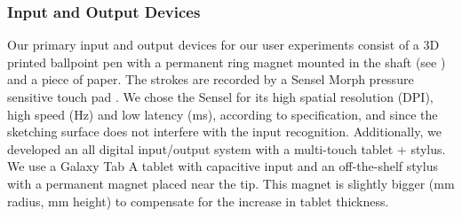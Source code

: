 \subsubsection{Input and Output Devices}
Our primary input and output devices for our user experiments consist of a 3D printed ballpoint pen with a permanent ring magnet mounted in the shaft (see ) and a piece of paper. 
The strokes are recorded by a Sensel Morph pressure sensitive touch pad \cite{morph}. 
We chose the Sensel for its high spatial resolution (\unit[6502]{DPI}), high speed (\unit[500]{Hz}) and low latency (\unit[2]{ms}), according to specification, and since the sketching surface does not interfere with the input recognition.
% 
Additionally, we developed an all digital input/output system with a multi-touch tablet + stylus. 
We use a Galaxy Tab A tablet with capacitive input and an off-the-shelf stylus with a permanent magnet placed near the tip. 
This magnet is slightly bigger (\unit[12]{mm} radius, \unit[12]{mm} height) to compensate for the increase in tablet thickness. 